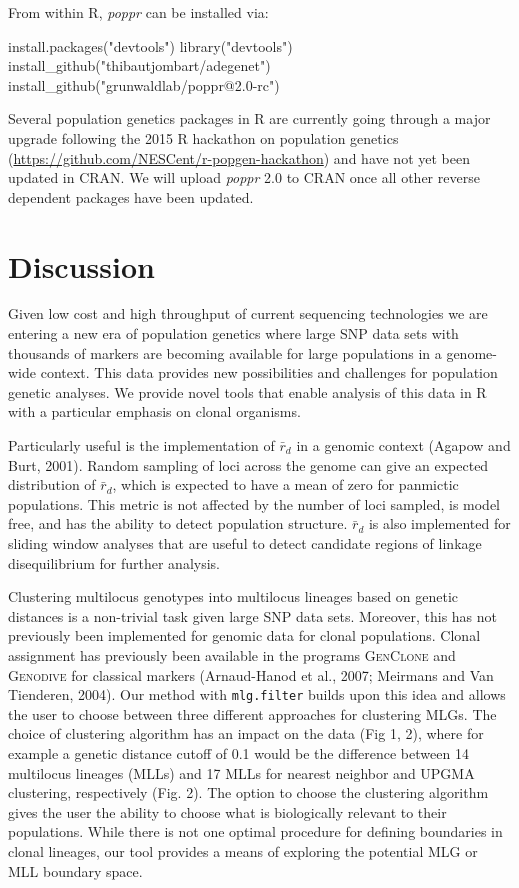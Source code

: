 \documentclass{frontiersSCNS} %
\newenvironment{CodeChunk}{}{}
\begin{document}
From within R, \emph{poppr} can be installed via:

\begin{CodeChunk}
\begin{CodeInput}
install.packages("devtools")
library("devtools")
install_github("thibautjombart/adegenet")
install_github("grunwaldlab/poppr@2.0-rc")
\end{CodeInput}
\end{CodeChunk}

Several population genetics packages in R are currently going through a
major upgrade following the 2015 R hackathon on population genetics
(\url{https://github.com/NESCent/r-popgen-hackathon}) and have not yet
been updated in CRAN. We will upload \emph{poppr} 2.0 to CRAN once all
other reverse dependent packages have been updated.

\section*{Discussion}\label{discussion}

Given low cost and high throughput of current sequencing technologies we
are entering a new era of population genetics where large SNP data sets
with thousands of markers are becoming available for large populations
in a genome- wide context. This data provides new possibilities and
challenges for population genetic analyses. We provide novel tools that
enable analysis of this data in R with a particular emphasis on clonal
organisms.

Particularly useful is the implementation of \(\bar{r}_d\) in a genomic
context (Agapow and Burt, 2001). Random sampling of loci across the
genome can give an expected distribution of \(\bar{r}_d\), which is
expected to have a mean of zero for panmictic populations. This metric
is not affected by the number of loci sampled, is model free, and has
the ability to detect population structure. \(\bar{r}_d\) is also
implemented for sliding window analyses that are useful to detect
candidate regions of linkage disequilibrium for further analysis.

Clustering multilocus genotypes into multilocus lineages based on
genetic distances is a non-trivial task given large SNP data sets.
Moreover, this has not previously been implemented for genomic data for
clonal populations. Clonal assignment has previously been available in
the programs \textsc{GenClone} and \textsc{Genodive} for classical
markers (Arnaud-Hanod et al., 2007; Meirmans and Van Tienderen, 2004).
Our method with \texttt{mlg.filter} builds upon this idea and allows the
user to choose between three different approaches for clustering MLGs.
The choice of clustering algorithm has an impact on the data (Fig 1, 2),
where for example a genetic distance cutoff of 0.1 would be the
difference between 14 multilocus lineages (MLLs) and 17 MLLs for nearest
neighbor and UPGMA clustering, respectively (Fig. 2). The option to
choose the clustering algorithm gives the user the ability to choose
what is biologically relevant to their populations. While there is not
one optimal procedure for defining boundaries in clonal lineages, our
tool provides a means of exploring the potential MLG or MLL boundary
space.
\end{document}
